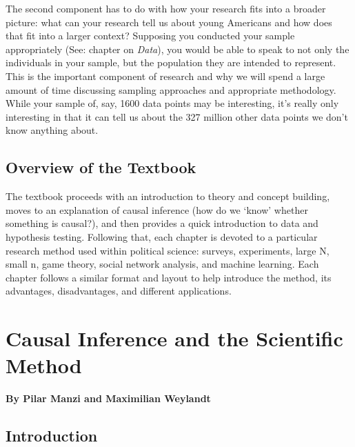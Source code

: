 \documentclass{book}
\begin{document}
The second component has to do with how your research fits into a broader
picture: what can your research tell us about young Americans and how does
that fit into a larger context? Supposing you conducted your sample
appropriately (See: chapter on \emph{Data}), you would be able to speak to not
only the individuals in your sample, but the population they are intended to
represent. This is the important component of research and why we will spend a
large amount of time discussing sampling approaches and appropriate
methodology. While your sample of, say, 1600 data points may be interesting,
it's really only interesting in that it can tell us about the 327 million
other data points we don't know anything about.

\hypertarget{overview-of-the-textbook}{%
\section{Overview of the Textbook}\label{overview-of-the-textbook}}

The textbook proceeds with an introduction to theory and concept building,
moves to an explanation of causal inference (how do we `know' whether
something is causal?), and then provides a quick introduction to data and
hypothesis testing. Following that, each chapter is devoted to a particular
research method used within political science: surveys, experiments, large N,
small n, game theory, social network analysis, and machine learning. Each
chapter follows a similar format and layout to help introduce the method, its
advantages, disadvantages, and different applications.

\hypertarget{causal-inference-and-the-scientific-method}{%
\chapter{Causal Inference and the Scientific
Method}\label{causal-inference-and-the-scientific-method}}

\textbf{By Pilar Manzi and Maximilian Weylandt}

\hypertarget{introduction-1}{%
\section{Introduction}\label{introduction-1}}
\end{document}
